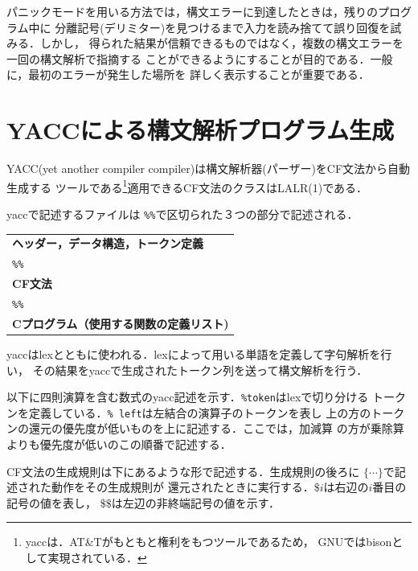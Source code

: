 \documentclass[a4j,dvipdfmx]{jbook}
\begin{document}
パニックモードを用いる方法では，構文エラーに到達したときは，残りのプログラム中に
分離記号(デリミター)を見つけるまで入力を読み捨てて誤り回復を試みる．しかし，
得られた結果が信頼できるものではなく，複数の構文エラーを一回の構文解析で指摘する
ことができるようにすることが目的である．一般に，最初のエラーが発生した場所を
詳しく表示することが重要である．

\section{YACCによる構文解析プログラム生成}

YACC(yet another compiler compiler)は構文解析器(パーザー)をCF文法から自動生成する
ツールである\footnote{yaccは．AT\&Tがもともと権利をもつツールであるため，
  GNUではbisonとして実現されている．}適用できるCF文法のクラスはLALR(1)である．

yaccで記述するファイルは \verb|%%|で区切られた３つの部分で記述される．
\begin{center}

  \begin{minipage}{0.6\linewidth}
    \begin{tabularx}{\linewidth}{l}
      {\bf ヘッダー，データ構造，トークン定義}    \\[10pt]
      \texttt{\%\%}              \\[10pt]
      {\bf CF文法}                 \\[10pt]
      \texttt{\%\%}              \\[10pt]
      {\bf Cプログラム（使用する関数の定義リスト)} \\
    \end{tabularx}
  \end{minipage}
\end{center}

yaccはlexとともに使われる．lexによって用いる単語を定義して字句解析を行い，
その結果をyaccで生成されたトークン列を送って構文解析を行う．

以下に四則演算を含む数式のyacc記述を示す．\texttt{\%token}はlexで切り分ける
トークンを定義している．\texttt{\% left}は左結合の演算子のトークンを表し
上の方のトークンの還元の優先度が低いものを上に記述する．ここでは，加減算
の方が乗除算よりも優先度が低いのこの順番で記述する．

CF文法の生成規則は下にあるような形で記述する．生成規則の後ろに
$\texttt{\{}\cdots\texttt{\}}$で記述された動作をその生成規則が
還元されたときに実行する．$\texttt{\$}i$は右辺の$i$番目の記号の値を表し，
$\texttt{\$\$}$は左辺の非終端記号の値を示す．
\end{document}
